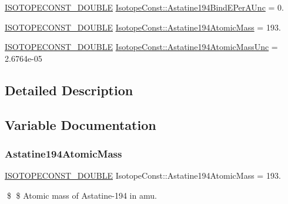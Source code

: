 \begin{DoxyCompactItemize}
\mbox{\hyperlink{group___isotope_const-_macros_ga8f45a7272ce02c0b4c65c44636ed719a}{I\+S\+O\+T\+O\+P\+E\+C\+O\+N\+S\+T\+\_\+\+D\+O\+U\+B\+LE}} \mbox{\hyperlink{group___isotope_const-_astatine-_at194_gadd8f723271a1439fcf03246358ed5546}{Isotope\+Const\+::\+Astatine194\+Bind\+E\+Per\+A\+Unc}} = 0.
\item 
\mbox{\hyperlink{group___isotope_const-_macros_ga8f45a7272ce02c0b4c65c44636ed719a}{I\+S\+O\+T\+O\+P\+E\+C\+O\+N\+S\+T\+\_\+\+D\+O\+U\+B\+LE}} \mbox{\hyperlink{group___isotope_const-_astatine-_at194_gabe5fcc42daff70bcdbf983f20752c3b0}{Isotope\+Const\+::\+Astatine194\+Atomic\+Mass}} = 193.
\item 
\mbox{\hyperlink{group___isotope_const-_macros_ga8f45a7272ce02c0b4c65c44636ed719a}{I\+S\+O\+T\+O\+P\+E\+C\+O\+N\+S\+T\+\_\+\+D\+O\+U\+B\+LE}} \mbox{\hyperlink{group___isotope_const-_astatine-_at194_gaa3062346bc6b0f5af3307a89a61b38b3}{Isotope\+Const\+::\+Astatine194\+Atomic\+Mass\+Unc}} = 2.\+6764e-\/05
\end{DoxyCompactItemize}


\subsection{Detailed Description}


\subsection{Variable Documentation}
\mbox{\label{group___isotope_const-_astatine-_at194_gabe5fcc42daff70bcdbf983f20752c3b0}} 
\subsubsection{\texorpdfstring{Astatine194\+Atomic\+Mass}{Astatine194AtomicMass}}
{\footnotesize\ttfamily \mbox{\hyperlink{group___isotope_const-_macros_ga8f45a7272ce02c0b4c65c44636ed719a}{I\+S\+O\+T\+O\+P\+E\+C\+O\+N\+S\+T\+\_\+\+D\+O\+U\+B\+LE}} Isotope\+Const\+::\+Astatine194\+Atomic\+Mass = 193.}

\$ \$ Atomic mass of Astatine-\/194 in amu. \mbox{\label{group___isotope_const-_astatine-_at194_gaa3062346bc6b0f5af3307a89a61b38b3}} 
